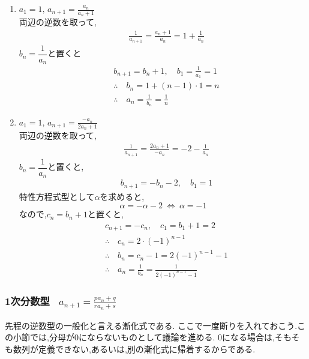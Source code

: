     \noindent{}
    \begin{enumerate}[label=(\arabic*),parsep=3pt,format=\bookitemlink{example-fractional-1}{solution}{problem}]
      \item $\displaystyle a_1=1,\, a_{n+1}=\frac{a_n}{a_n+1}$\\
            両辺の逆数を取って,
            \begin{align*}
              &\frac{1}{a_{n+1}}=\frac{a_n+1}{a_n}=1+\frac{1}{a_n}
            \end{align*}
            $b_n=\dfrac{1}{a_n}$と置くと
            \begin{align*}
              &b_{n+1}=b_n+1,\quad b_1=\frac{1}{a_1}=1\\
              &\therefore \quad b_n=1+(n-1)\cdot1=n\\
              &\therefore \quad a_n=\frac{1}{b_n}=\frac{1}{n}
            \end{align*}
      \item $\displaystyle a_1=1,\, a_{n+1}=\frac{-a_n}{2a_n+1}$\\
            両辺の逆数を取って,
            \begin{align*}
              &\frac{1}{a_{n+1}}=\frac{2a_n+1}{-a_n}=-2-\frac{1}{a_n}
            \end{align*}
            $b_n=\dfrac{1}{a_n}$と置くと,
            \begin{align*}
              &b_{n+1}=-b_n-2,\quad b_1=1
            \end{align*}
            特性方程式型として$\alpha$を求めると,
            \[
              \alpha=-\alpha-2 \ \Leftrightarrow\ \alpha=-1
            \]
            なので,$c_n=b_n+1$と置くと,
            \begin{align*}
              &c_{n+1}=-c_n,\quad c_1=b_1+1=2\\
              &\therefore \quad c_n=2\cdot(-1)^{n-1}\\
              &\therefore \quad b_n=c_n-1=2(-1)^{n-1}-1\\
              &\therefore \quad a_n=\frac{1}{b_n}=\frac{1}{2(-1)^{n-1}-1}
            \end{align*}
    \end{enumerate}
  \subsubsection{\texorpdfstring{1次分数型 \, $\displaystyle a_{n+1}=\frac{pa_n+q}{ra_n+s}$}{1次分数型}}
    先程の逆数型の一般化と言える漸化式である.
    ここで一度断りを入れておこう.この小節では,分母が0にならないものとして議論を進める.
    0になる場合は,そもそも数列が定義できない,あるいは,別の漸化式に帰着するからである.

